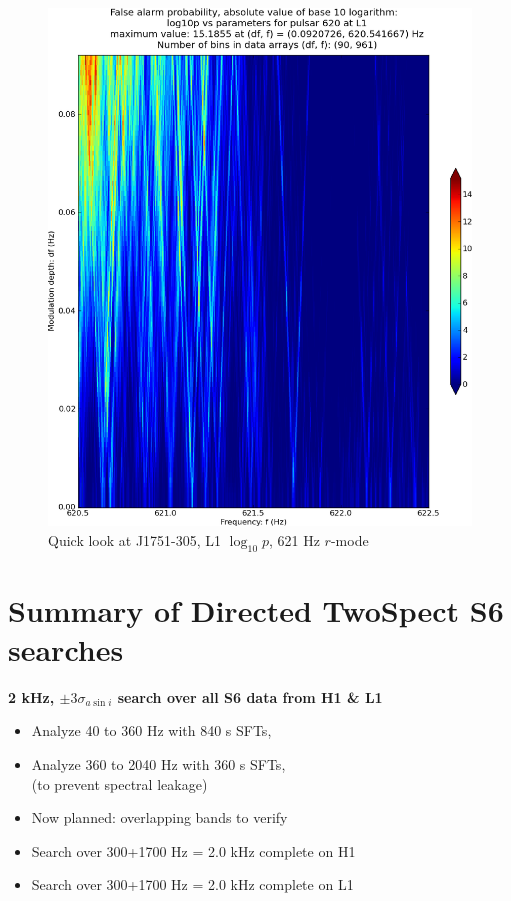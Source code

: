 \begin{figure}
\begin{center}
\includegraphics[width=0.5\paperwidth,height=0.35\paperheight]{plots/DFvsFresultsProb-L1_pulsar-620.eps}
\caption{
Quick look at J1751-305, L1 $\log_{10}p$, 621 Hz $r$-mode}
\end{center}
\end{figure}


\section{Summary of Directed TwoSpect S6 searches}

\textbf{2 kHz, $\pm 3 \sigma_{a \sin i}$ search over all S6 data from H1 \& L1}
\begin{itemize}
\item Analyze 40 to 360 Hz with 840 s SFTs,
\item Analyze 360 to 2040 Hz with 360 s SFTs,\\
(to prevent spectral leakage)
\item Now planned: overlapping bands to verify
\item Search over 300+1700 Hz = 2.0 kHz complete on H1
\item Search over 300+1700 Hz = 2.0 kHz complete on L1
\end{itemize}


